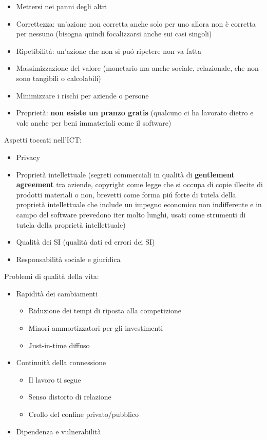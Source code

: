 \begin{itemize}

\item
  Mettersi nei panni degli altri
\item
  Correttezza: un'azione non corretta anche solo per uno allora non \`e
  corretta per nessuno (bisogna quindi focalizzarsi anche sui casi
  singoli)
\item
  Ripetibilit\`a: un'azione che non si pu\'o ripetere non va fatta
\item
  Massimizzazione del valore (monetario ma anche sociale, relazionale,
  che non sono tangibili o calcolabili)
\item
  Minimizzare i rischi per aziende o persone
\item
  Propriet\`a: \textbf{non esiste un pranzo gratis} (qualcuno ci ha lavorato
  dietro e vale anche per beni immateriali come il software)
\end{itemize}

Aspetti toccati nell'ICT:

\begin{itemize}

\item
  Privacy
\item
  Propriet\`a intellettuale (segreti commerciali in qualit\`a di
  \textbf{gentlement agreement} tra aziende, copyright come legge che si
  occupa di copie illecite di prodotti materiali o non, brevetti come
  forma pi\'u forte di tutela della propriet\`a intellettuale che include un
  impegno economico non indifferente e in campo del software prevedono
  iter molto lunghi, usati come strumenti di tutela della propriet\`a
  intellettuale)
\item
  Qualit\`a dei SI (qualit\`a dati ed errori dei SI)
\item
  Responsabilit\`a sociale e giuridica
\end{itemize}

Problemi di qualit\`a della vita:

\begin{itemize}

\item
  Rapidit\`a dei cambiamenti
  
  \begin{itemize}
    \item 
      Riduzione dei tempi di riposta alla competizione
    \item 
      Minori ammortizzatori per gli investimenti
    \item
      Just-in-time diffuso
  \end{itemize}
\item
  Continuit\`a della connessione
  \begin{itemize}
    
    \item 
      Il lavoro ti segue
    \item 
      Senso distorto di relazione
    \item 
      Crollo del confine privato/pubblico
  \end{itemize}
\item
  Dipendenza e vulnerabilit\`a
\end{itemize}

